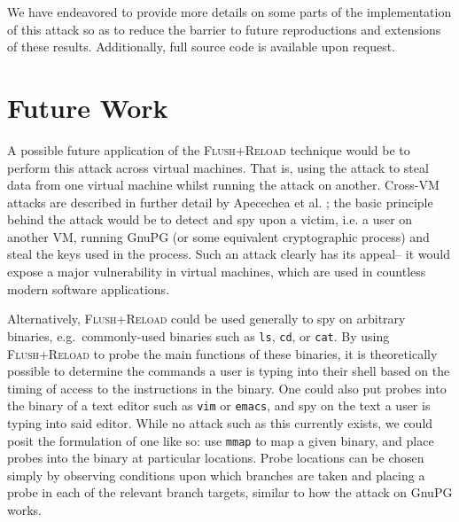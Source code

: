 \documentclass[11pt]{llncs}
\newcommand{\flushreload}{\textsc{Flush}+\textsc{Reload}}
\begin{document}
We have endeavored to provide more details on some parts of the implementation
of this attack so as to reduce the barrier to future reproductions and
extensions of these results. Additionally, full source code is available upon
request.

\section{Future Work} %

A possible future application of the \flushreload{} technique would be to
perform this attack across virtual machines. That is, using the attack to steal
data from one virtual machine whilst running the attack on another. Cross-VM
attacks are described in further detail by Apecechea et al.
\cite{cryptoeprint:2014:248}; the basic principle behind the attack would be to
detect and spy upon a victim, i.e. a user on another VM, running GnuPG (or some
equivalent cryptographic process) and steal the keys used in the process.  Such
an attack clearly has its appeal-- it would expose a major vulnerability in
virtual machines, which are used in countless modern software applications.

Alternatively, \flushreload{} could be used generally to spy on arbitrary
binaries, e.g.\ commonly-used binaries such as \texttt{ls}, \texttt{cd}, or
\texttt{cat}. By using \flushreload{} to probe the main functions of these
binaries, it is theoretically possible to determine the commands a user is
typing into their shell based on the timing of access to the instructions in the
binary. One could also put probes into the binary of a text editor such as
\texttt{vim} or \texttt{emacs}, and spy on the text a user is typing into said
editor. While no attack such as this currently exists, we could posit the
formulation of one like so: use \texttt{mmap} to map a given binary, and place
probes into the binary at particular locations. Probe locations can be chosen
simply by observing conditions upon which branches are taken and placing a probe
in each of the relevant branch targets, similar to how the attack on GnuPG
works.

\lobsectionbreak




\hspace*{7cm} 
 \hfill
\end{document}
